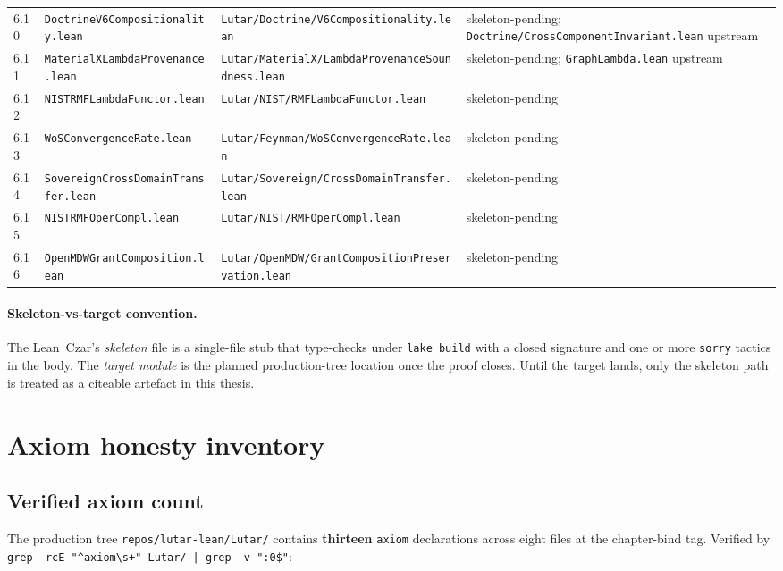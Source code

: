 \begin{table}[h!]
\begin{tabular}{lllp{3.2cm}}
6.10 & \texttt{DoctrineV6Compositionality.lean} & \texttt{Lutar/Doctrine/V6Compositionality.lean} & skeleton-pending; \texttt{Doctrine/CrossComponentInvariant.lean} upstream \\
6.11 & \texttt{MaterialXLambdaProvenance.lean} & \texttt{Lutar/MaterialX/LambdaProvenanceSoundness.lean} & skeleton-pending; \texttt{GraphLambda.lean} upstream \\
6.12 & \texttt{NISTRMFLambdaFunctor.lean} & \texttt{Lutar/NIST/RMFLambdaFunctor.lean} & skeleton-pending \\
6.13 & \texttt{WoSConvergenceRate.lean} & \texttt{Lutar/Feynman/WoSConvergenceRate.lean} & skeleton-pending \\
6.14 & \texttt{SovereignCrossDomainTransfer.lean} & \texttt{Lutar/Sovereign/CrossDomainTransfer.lean} & skeleton-pending \\
6.15 & \texttt{NISTRMFOperCompl.lean} & \texttt{Lutar/NIST/RMFOperCompl.lean} & skeleton-pending \\
6.16 & \texttt{OpenMDWGrantComposition.lean} & \texttt{Lutar/OpenMDW/GrantCompositionPreservation.lean} & skeleton-pending \\
\hline
\end{tabular}
\end{table}

\paragraph{Skeleton-vs-target convention.} The Lean~Czar's
\emph{skeleton} file is a single-file stub that type-checks under
\texttt{lake build} with a closed signature and one or more
\texttt{sorry} tactics in the body. The \emph{target module} is the
planned production-tree location once the proof closes. Until the
target lands, only the skeleton path is treated as a citeable
artefact in this thesis.

\section{Axiom honesty inventory}
\label{sec:axiom-honesty}

\subsection{Verified axiom count}

The production tree \texttt{repos/lutar-lean/Lutar/} contains
\textbf{thirteen} \texttt{axiom} declarations across eight files at the
chapter-bind tag. Verified by
\texttt{grep -rcE "\^{}axiom\textbackslash s+" Lutar/ | grep -v ":0\$"}:

